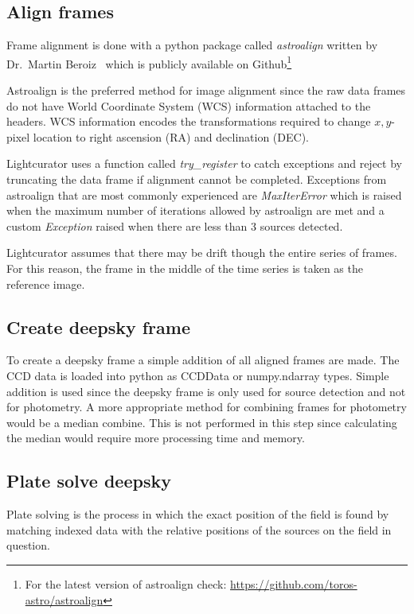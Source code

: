 \subsection{Align frames}
\label{section:align}
Frame alignment is done with a python package called \textit{astroalign} written by Dr.\ Martin Beroiz~\cite{beroiz_2019} which is publicly
available on Github\footnote{For the latest version of astroalign check: \url{https://github.com/toros-astro/astroalign}}

Astroalign is the preferred method for image alignment since the raw data frames do not have World Coordinate System (WCS) information attached to
the headers.
WCS information encodes the transformations required to change $x,y$-pixel location to right ascension (RA) and declination (DEC).

Lightcurator uses a function called \textit{try\_register} to catch exceptions and reject by truncating the data frame if alignment
cannot be completed.
Exceptions from astroalign that are most commonly experienced are \textit{MaxIterError} which is raised when the maximum number of iterations
allowed by astroalign are met and a custom \textit{Exception} raised when there are less than 3 sources detected.

Lightcurator assumes that there may be drift though the entire series of
frames.
For this reason, the frame in the middle of the time series is taken as the
reference image.

\subsection{Create deepsky frame}
To create a deepsky frame a simple addition of all aligned frames are made.
The CCD data is loaded into python as CCDData or numpy.ndarray types.
Simple addition is used since the deepsky frame is only used for source 
detection and not for photometry.
A more appropriate method for combining frames for photometry would 
be a median combine. 
This is not performed in this step since calculating the median would require
more processing time and memory.

\subsection{Plate solve deepsky}
Plate solving is the process in which the exact position of the field
is found by matching indexed data with the relative positions of the
sources on the field in question.

